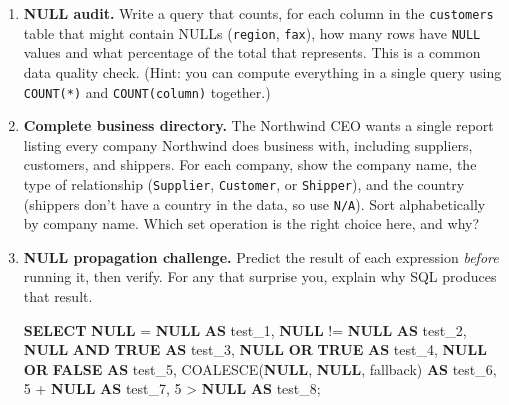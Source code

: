 \documentclass[
  letterpaper,
  DIV=11,
  numbers=noendperiod]{scrreprt}
\newenvironment{Shaded}{\begin{snugshade}}{\end{snugshade}}
\newcommand{\DecValTok}[1]{\textcolor[rgb]{0.68,0.00,0.00}{#1}}
\newcommand{\FunctionTok}[1]{\textcolor[rgb]{0.28,0.35,0.67}{#1}}
\newcommand{\KeywordTok}[1]{\textcolor[rgb]{0.00,0.23,0.31}{\textbf{#1}}}
\newcommand{\NormalTok}[1]{\textcolor[rgb]{0.00,0.23,0.31}{#1}}
\newcommand{\OperatorTok}[1]{\textcolor[rgb]{0.37,0.37,0.37}{#1}}
\newcommand{\StringTok}[1]{\textcolor[rgb]{0.13,0.47,0.30}{#1}}
\begin{document}
\begin{enumerate}
  Then rewrite it so it works correctly.
\item
  \textbf{NULL audit.} Write a query that counts, for each column in the
  \texttt{customers} table that might contain NULLs (\texttt{region},
  \texttt{fax}), how many rows have \texttt{NULL} values and what
  percentage of the total that represents. This is a common data quality
  check. (Hint: you can compute everything in a single query using
  \texttt{COUNT(*)} and \texttt{COUNT(column)} together.)
\item
  \textbf{Complete business directory.} The Northwind CEO wants a single
  report listing every company Northwind does business with, including
  suppliers, customers, and shippers. For each company, show the company
  name, the type of relationship
  (\texttt{\textquotesingle{}Supplier\textquotesingle{}},
  \texttt{\textquotesingle{}Customer\textquotesingle{}}, or
  \texttt{\textquotesingle{}Shipper\textquotesingle{}}), and the country
  (shippers don't have a country in the data, so use
  \texttt{\textquotesingle{}N/A\textquotesingle{}}). Sort alphabetically
  by company name. Which set operation is the right choice here, and
  why?
\item
  \textbf{NULL propagation challenge.} Predict the result of each
  expression \emph{before} running it, then verify. For any that
  surprise you, explain why SQL produces that result.

  \begin{codelisting}

  \caption{\texttt{duckdb}}

\begin{Shaded}
\begin{Highlighting}[]
\KeywordTok{SELECT}
    \KeywordTok{NULL} \OperatorTok{=} \KeywordTok{NULL} \KeywordTok{AS}\NormalTok{ test\_1,}
    \KeywordTok{NULL} \OperatorTok{!=} \KeywordTok{NULL} \KeywordTok{AS}\NormalTok{ test\_2,}
    \KeywordTok{NULL} \KeywordTok{AND} \KeywordTok{TRUE} \KeywordTok{AS}\NormalTok{ test\_3,}
    \KeywordTok{NULL} \KeywordTok{OR} \KeywordTok{TRUE} \KeywordTok{AS}\NormalTok{ test\_4,}
    \KeywordTok{NULL} \KeywordTok{OR} \KeywordTok{FALSE} \KeywordTok{AS}\NormalTok{ test\_5,}
    \FunctionTok{COALESCE}\NormalTok{(}\KeywordTok{NULL}\NormalTok{, }\KeywordTok{NULL}\NormalTok{, }\StringTok{\textquotesingle{}fallback\textquotesingle{}}\NormalTok{) }\KeywordTok{AS}\NormalTok{ test\_6,}
    \DecValTok{5} \OperatorTok{+} \KeywordTok{NULL} \KeywordTok{AS}\NormalTok{ test\_7,}
    \DecValTok{5} \OperatorTok{\textgreater{}} \KeywordTok{NULL} \KeywordTok{AS}\NormalTok{ test\_8;}
\end{Highlighting}
\end{Shaded}


\end{codelisting}
\end{enumerate}
\end{document}
